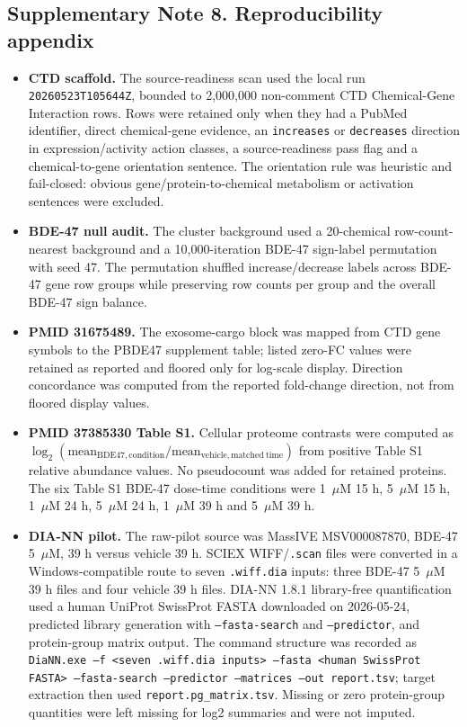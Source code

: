 \documentclass[11pt]{article}
\newcommand{\microM}{\ensuremath{\mu\mathrm{M}}}
\begin{document}
\subsection*{Supplementary Note 8. Reproducibility appendix}
\begin{itemize}[leftmargin=*]
\item \textbf{CTD scaffold.} The source-readiness scan used the local run \texttt{20260523T105644Z}, bounded to 2,000,000 non-comment CTD Chemical-Gene Interaction rows. Rows were retained only when they had a PubMed identifier, direct chemical-gene evidence, an \texttt{increases} or \texttt{decreases} direction in expression/activity action classes, a source-readiness pass flag and a chemical-to-gene orientation sentence. The orientation rule was heuristic and fail-closed: obvious gene/protein-to-chemical metabolism or activation sentences were excluded.
\item \textbf{BDE-47 null audit.} The cluster background used a 20-chemical row-count-nearest background and a 10,000-iteration BDE-47 sign-label permutation with seed 47. The permutation shuffled increase/decrease labels across BDE-47 gene row groups while preserving row counts per group and the overall BDE-47 sign balance.
\item \textbf{PMID 31675489.} The exosome-cargo block was mapped from CTD gene symbols to the PBDE47 supplement table; listed zero-FC values were retained as reported and floored only for log-scale display. Direction concordance was computed from the reported fold-change direction, not from floored display values.
\item \textbf{PMID 37385330 Table S1.} Cellular proteome contrasts were computed as \(\log_2(\mathrm{mean}_{\mathrm{BDE47,condition}}/\mathrm{mean}_{\mathrm{vehicle,matched\ time}})\) from positive Table S1 relative abundance values. No pseudocount was added for retained proteins. The six Table S1 BDE-47 dose-time conditions were 1~\microM{} 15 h, 5~\microM{} 15 h, 1~\microM{} 24 h, 5~\microM{} 24 h, 1~\microM{} 39 h and 5~\microM{} 39 h.
\item \textbf{DIA-NN pilot.} The raw-pilot source was MassIVE MSV000087870, BDE-47 5~\microM{}, 39 h versus vehicle 39 h. SCIEX WIFF/\texttt{.scan} files were converted in a Windows-compatible route to seven \texttt{.wiff.dia} inputs: three BDE-47 5~\microM{} 39 h files and four vehicle 39 h files. DIA-NN 1.8.1 library-free quantification used a human UniProt SwissProt FASTA downloaded on 2026-05-24, predicted library generation with \texttt{--fasta-search} and \texttt{--predictor}, and protein-group matrix output. The command structure was recorded as \texttt{DiaNN.exe --f <seven .wiff.dia inputs> --fasta <human SwissProt FASTA> --fasta-search --predictor --matrices --out report.tsv}; target extraction then used \texttt{report.pg\_matrix.tsv}. Missing or zero protein-group quantities were left missing for log2 summaries and were not imputed.

\end{itemize}
\end{document}
